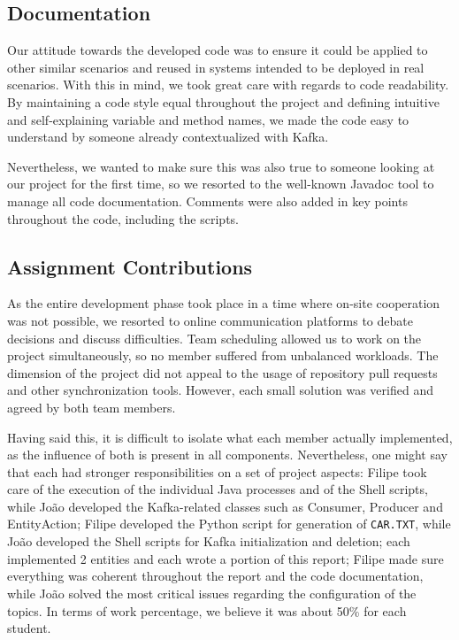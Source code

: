 \documentclass[12pt]{article}
\begin{document}
\subsection{Documentation} %

Our attitude towards the developed code was to ensure it could be applied to other similar scenarios and reused in systems intended to be deployed in real scenarios.
With this in mind, we took great care with regards to code readability.
By maintaining a code style equal throughout the project and defining intuitive and self-explaining variable and method names, we made the code easy to understand
by someone already contextualized with Kafka.

Nevertheless, we wanted to make sure this was also true to someone looking at our project for the first time, so we resorted to the well-known Javadoc 
\cite{javadoc} tool to manage all code documentation.
Comments were also added in key points throughout the code, including the scripts.

\subsection{Assignment Contributions} %

As the entire development phase took place in a time where on-site cooperation was not possible, we resorted to online communication platforms to debate decisions
and discuss difficulties.
Team scheduling allowed us to work on the project simultaneously, so no member suffered from unbalanced workloads.
The dimension of the project did not appeal to the usage of repository pull requests and other synchronization tools.
However, each small solution was verified and agreed by both team members.

Having said this, it is difficult to isolate what each member actually implemented, as the influence of both is present in all components.
Nevertheless, one might say that each had stronger responsibilities on a set of project aspects:
Filipe took care of the execution of the individual Java processes and of the Shell scripts, while João developed the Kafka-related classes such as Consumer,
Producer and EntityAction; Filipe developed the Python script for generation of \texttt{CAR.TXT}, while João developed the Shell scripts for Kafka initialization 
and deletion; each implemented 2 entities and each wrote a portion of this report; Filipe made sure everything was coherent throughout the report and the code 
documentation, while João solved the most critical issues regarding the configuration of the topics.
In terms of work percentage, we believe it was about 50\% for each student.
\end{document}
